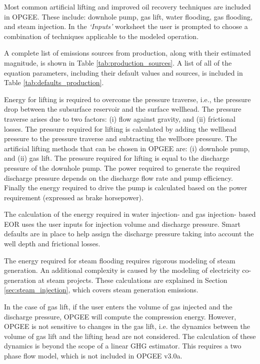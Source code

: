 \documentclass[11pt]{report}
\newcommand{\version}{v3.0a}
\newcommand{\sheet}[1]{\textit{`{#1}'}}
\begin{document}
Most common artificial lifting and improved oil recovery techniques are included in OPGEE. These include: downhole pump, gas lift, water flooding, gas flooding, and steam injection. In the \sheet{Inputs} worksheet the user is prompted to choose a combination of techniques applicable to the modeled operation. 

A complete list of emissions sources from production, along with their estimated magnitude, is shown in Table \ref{tab:production_sources}. A list of all of the equation parameters, including their default values and sources, is included in Table \ref{tab:defaults_production}.

Energy for lifting is required to overcome the pressure traverse, i.e., the pressure drop between the subsurface reservoir and the surface wellhead. The pressure traverse arises due to two factors: (i) flow against gravity, and (ii) frictional losses. The pressure required for lifting is calculated by adding the wellhead pressure to the pressure traverse and subtracting the wellbore pressure. The artificial lifting methods that can be chosen in OPGEE are: (i) downhole pump, and (ii) gas lift. The pressure required for lifting is equal to the discharge pressure of the downhole pump. The power required to generate the required discharge pressure depends on the discharge flow rate and pump efficiency. Finally the energy required to drive the pump is calculated based on the power requirement (expressed as brake horsepower). 

The calculation of the energy required in water injection- and gas injection- based EOR uses the user inputs for injection volume and discharge pressure. Smart defaults are in place to help assign the discharge pressure taking into account the well depth and frictional losses. 

The energy required for steam flooding requires rigorous modeling of steam generation. An additional complexity is caused by the modeling of electricity co-generation at steam projects. These calculations are explained in Section\,\ref{sec:steam_injection}, which covers steam generation emissions.

In the case of gas lift, if the user enters the volume of gas injected and the discharge pressure, OPGEE will compute the compression energy. However, OPGEE is not sensitive to changes in the gas lift, i.e. the dynamics between the volume of gas lift and the lifting head are not considered. The calculation of these dynamics is beyond the scope of a linear GHG estimator. This requires a two phase flow model, which is not included in OPGEE \version.
\end{document}
